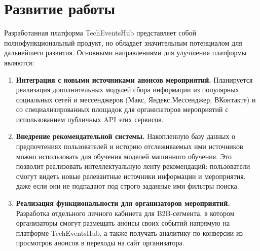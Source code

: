 \section*{Развитие работы}
Разработанная платформа TechEventsHub представляет собой полнофункциональный продукт, но обладает значительным потенциалом для дальнейшего развития. 
Основными направлениями для улучшения платформы являются:

\begin{enumerate}
\item \textbf{Интеграция с новыми источниками анонсов мероприятий.} Планируется реализация дополнительных модулей сбора информации из популярных социальных сетей и мессенджеров (Макс, Яндекс.Мессенджер, ВКонтакте) и со специализированных площадок для организаторов мероприятий с использованием публичных API этих сервисов.

\item \textbf{Внедрение рекомендательной системы.} Накопленную базу данных о предпочтениях пользователей и историю отслеживаемых ими источников можно использовать для обучения моделей машинного обучения. 
Это позволит реализовать интеллектуальную ленту рекомендаций: пользователи смогут видеть новые релевантные источники информации и мероприятия, даже если они не подпадают под строго заданные ими фильтры поиска.

\item \textbf{Реализация функциональности для организаторов мероприятий.} Разработка отдельного личного кабинета для B2B-сегмента, в котором организаторы смогут размещать анонсы своих событий напрямую на платформе TechEventsHub, а также получать аналитику по конверсии из просмотров анонсов в переходы на сайт организатора.

\end{enumerate}